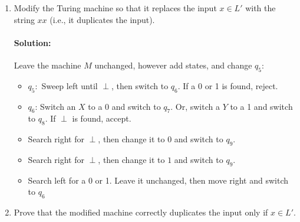\documentclass{article}
\begin{document}
\begin{enumerate}
\begin{enumerate}[label= (\alph*)]
                Could not finish this :(
                \begin{proof} 
                    Suppose that $M$ accepts $x$. Then after $q_0$ through $q_4$ have finished processing, there will be no $0,1$ on the tape (In order for $M$ to accept a string, it must have reached $q_5$ at the right end of the tape and $q_5$ must find no 0,1 in the tape).
                    \iffalse  
                    First observe the design of the machine is such that we iterate over $q_1$, to $q_4$, so that a valid string will have the following structure after $k$ iterations:
                    \begin{itemize}
                        \item  $X^k$ followed by $0^{n-k}$ (first block of 0s).
                        \item  $Y^k$ followed by $1^{n-k}$ (second block of 1s).
                        \item  $X^k$ followed by $0^{n-k}$ (third block of 0s).
                        \item  $Y^k$ followed by $1^{n-k}$ (fourth block of 1s).
                    \end{itemize}
                    Proceed by induction on $n$. If $n=0$, the tape is empty, and $q_0$ will move to $q_5$, which will search left, find a 
                    \fi
                \end{proof}
            \item Modify the Turing machine so that it replaces the input $x\in L'$ with the string $xx$ (i.e., it duplicates the input).
                \paragraph{Solution: }Leave the machine $M$ unchanged, however add states, and change $q_5:$ 
                \begin{itemize}
                    \item[] $q_5:$ Sweep left until $\perp $, then switch to $q_6$. If  a 0 or 1 is found, reject.
                    \item[] $q_6$: Switch an $X$ to a 0 and switch to $q_7$. Or, switch a $Y$ to a 1 and switch to $q_8$. If $\perp $ is found, accept.
                    \item[] Search right for $\perp $, then change it to $0$ and switch to $q_9$.
                    \item[] Search right for $\perp $, then change it to $1$ and switch to $q_9$.
                    \item[] Search left for a 0 or 1. Leave it unchanged, then move right and switch to  $q_6$
                \end{itemize}
            \item Prove that the modified machine correctly duplicates the input only if $x\in L'$.


\end{enumerate}
\end{enumerate}
\end{document}
